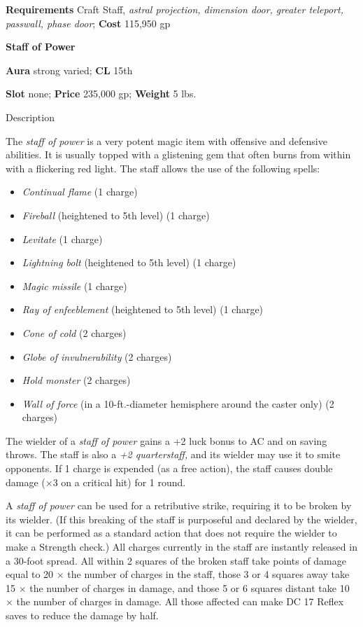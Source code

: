 \textbf{Requirements} Craft Staff, \textit{astral projection, dimension door, greater teleport, passwall, phase door}; \textbf{Cost }115,950 gp
				
\textbf{Staff of Power}
				
\textbf{Aura} strong varied; \textbf{CL} 15th
				
\textbf{Slot }none; \textbf{Price} 235,000 gp; \textbf{Weight} 5 lbs.
				
Description
				
The \textit{staff of power }is a very potent magic item with offensive and defensive abilities. It is usually topped with a glistening gem that often burns from within with a flickering red light. The staff allows the use of the following spells:
				\begin{itemize}\item  \textit{Continual flame} (1 charge)
				\item  \textit{Fireball} (heightened to 5th level) (1 charge)
				\item  \textit{Levitate} (1 charge)
				\item  \textit{Lightning bolt} (heightened to 5th level) (1 charge)
				\item  \textit{Magic missile} (1 charge)
				\item  \textit{Ray of enfeeblement} (heightened to 5th level) (1 charge)
				\item  \textit{Cone of cold} (2 charges)
				\item  \textit{Globe of invulnerability} (2 charges)
				\item  \textit{Hold monster} (2 charges)
				\item  \textit{Wall of force} (in a 10-ft.-diameter hemisphere around the caster only) (2 charges)
\end{itemize}
				
The wielder of a \textit{staff of power }gains a +2 luck bonus to AC and on saving throws. The staff is also a \textit{+2 quarterstaff, }and its wielder may use it to smite opponents. If 1 charge is expended (as a free action), the staff causes double damage (\mbox{$\times$}3 on a critical hit) for 1 round.
				
A \textit{staff of power }can be used for a retributive strike, requiring it to be broken by its wielder. (If this breaking of the staff is purposeful and declared by the wielder, it can be performed as a standard action that does not require the wielder to make a Strength check.) All charges currently in the staff are instantly released in a 30-foot spread. All within 2 squares of the broken staff take points of damage equal to 20 \mbox{$\times$} the number of charges in the staff, those 3 or 4 squares away take 15 \mbox{$\times$} the number of charges in damage, and those 5 or 6 squares distant take 10 \mbox{$\times$} the number of charges in damage. All those affected can make DC 17 Reflex saves to reduce the damage by half.
				
